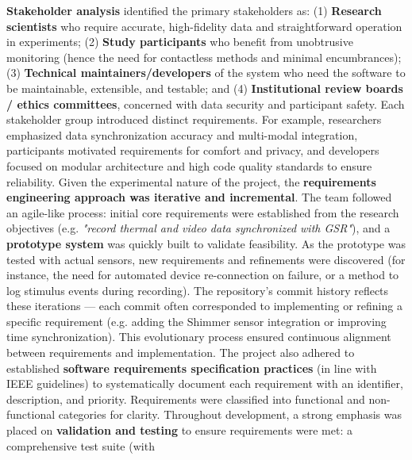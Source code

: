 \textbf{Stakeholder analysis} identified the primary stakeholders as: (1) \textbf{Research scientists} who require accurate, high-fidelity data and straightforward operation in experiments; (2) \textbf{Study participants} who benefit from unobtrusive monitoring (hence the need for contactless methods and minimal encumbrances); (3) \textbf{Technical maintainers/developers} of the system who need the software to be maintainable, extensible, and testable; and (4) \textbf{Institutional review boards / ethics committees}, concerned with data security and participant safety. Each stakeholder group introduced distinct requirements. For example, researchers emphasized data synchronization accuracy and multi-modal integration, participants motivated requirements for comfort and privacy, and developers focused on modular architecture and high code quality standards to ensure reliability. Given the experimental nature of the project, the \textbf{requirements engineering approach was iterative and incremental}. The team followed an agile-like process: initial core requirements were established from the research objectives (e.g. \textit{"record thermal and video data synchronized with GSR"}), and a \textbf{prototype system} was quickly built to validate feasibility. As the prototype was tested with actual sensors, new requirements and refinements were discovered (for instance, the need for automated device re-connection on failure, or a method to log stimulus events during recording). The repository's commit history reflects these iterations --- each commit often corresponded to implementing or refining a specific requirement (e.g. adding the Shimmer sensor integration or improving time synchronization). This evolutionary process ensured continuous alignment between requirements and implementation. The project also adhered to established \textbf{software requirements specification practices} (in line with IEEE guidelines) to systematically document each requirement with an identifier, description, and priority. Requirements were classified into functional and non-functional categories for clarity. Throughout development, a strong emphasis was placed on \textbf{validation and testing} to ensure requirements were met: a comprehensive test suite (with %